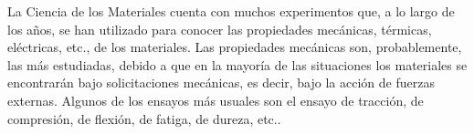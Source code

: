 



La Ciencia de los Materiales cuenta con muchos experimentos que, a lo largo de los años, se han utilizado para conocer las propiedades mecánicas, térmicas, eléctricas, etc., de los materiales. Las propiedades mecánicas son, probablemente, las más estudiadas, debido a que en la mayoría de las situaciones los materiales se encontrarán bajo solicitaciones mecánicas, es decir, bajo la acción de fuerzas externas. Algunos de los ensayos más usuales son el ensayo de tracción, de compresión, de flexión, de fatiga, de dureza, etc..  

